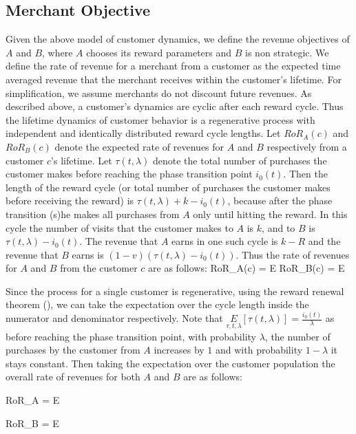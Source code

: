 \subsection{Merchant Objective}
Given the above model of customer dynamics, we define the revenue objectives of $A$ and $B$, where $A$ chooses its reward parameters and $B$ is non strategic. 
We define the rate of revenue for a merchant from a customer as the expected time averaged revenue that the merchant receives within the customer's lifetime.
For simplification, we assume merchants do not discount future revenues.
As described above, a customer's dynamics are cyclic after each reward cycle.
Thus the lifetime dynamics of customer behavior is a regenerative process with independent and identically distributed reward cycle lengths.
Let $RoR_A(c)$ and $RoR_B(c)$ denote the expected rate of revenues for $A$ and $B$ respectively from a customer $c$'s lifetime.
Let $\tau(t, \lambda)$ denote the total number of purchases the customer makes before reaching the phase transition point $i_0(t)$.
Then the length of the reward cycle (or total number of purchases the customer makes before receiving the reward) is $\tau(t, \lambda) + k - i_0(t)$, because after the phase transition (s)he makes all purchases from $A$ only until hitting the reward.
In this cycle the number of visits that the customer makes to $A$ is $k$, and to $B$ is $\tau(t,\lambda) - i_0(t)$.
The revenue that $A$ earns in one such cycle is $k-R$ and the revenue that $B$ earns is $(1-v)(\tau(t,\lambda) - i_0(t))$.
Thus the rate of revenues for $A$ and $B$ from the customer $c$ are as follows:
\beq
RoR_A(c) = E\notag
\eeq
\beq
RoR_B(c) = E\notag
\eeq

Since the process for a single customer is regenerative, using the reward renewal theorem (\cite{10.2307/1426216}), we can take the expectation over the cycle length inside the numerator and denominator respectively.
Note that $\underset{\tau, t, \lambda}E[\tau(t,\lambda)] = \frac{i_0(t)}{\lambda}$ as before reaching the phase transition point, with probability $\lambda$, the number of purchases by the customer from $A$ increases by $1$ and with probability $1-\lambda$ it stays constant.
Then taking the expectation over the customer population the overall rate of revenues for both $A$ and $B$ are as follows:

\beq
RoR_A = E
\eeq

\beq
RoR_B = E
\eeq
